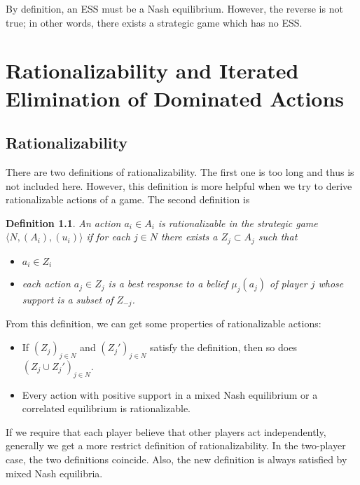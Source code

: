 \documentclass[openany]{book}
\newtheorem{definition}{Definition}[chapter]
\begin{document}
By definition, an ESS must be a Nash equilibrium. However, the reverse is not true; in other words, there exists a strategic game which has no ESS.

\chapter{Rationalizability and Iterated Elimination of Dominated Actions}
\section{Rationalizability}
There are two definitions of rationalizability. The first one is too long and thus is not included here. However, this definition is more helpful when we try to derive rationalizable actions of a game. The second definition is
\begin{definition}
An action $a_i\in A_i$ is rationalizable in the strategic game $\langle N,(A_i),(u_i)\rangle$ if for each $j\in N$ there exists a $Z_j\subset A_j$ such that
\begin{itemize}
\item $a_i\in Z_i$
\item each action $a_j\in Z_j$ is a best response to a belief $\mu_j(a_j)$ of player $j$ whose support is a subset of $Z_{-j}$.
\end{itemize}
\end{definition}

From this definition, we can get some properties of rationalizable actions:
\begin{itemize}
\item If $(Z_j)_{j\in N}$ and $(Z_j')_{j\in N}$ satisfy the definition, then so does $(Z_j\cup Z_j')_{j\in N}$.
\item Every action with positive support in a mixed Nash equilibrium or a correlated equilibrium is rationalizable.
\end{itemize}

If we require that each player believe that other players act independently, generally we get a more restrict definition of rationalizability. In the two-player case, the two definitions coincide. Also, the new definition is always satisfied by mixed Nash equilibria.
\end{document}
